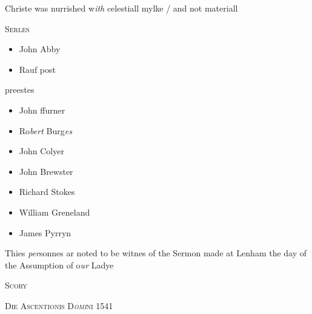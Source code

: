 \documentclass[12pt, a4paper]{book}
\begin{document}
		\ifthenelse{\isodd{\thepage}}
		{\reversemarginpar}
		{\normalmarginpar}
		Christe was nurrished w\textit{ith} celestiall mylke / and
            	not materiall
            
 

                  
				\begin{center}  {\scshape Serles}  \end{center}
			
 
 	
 	
 	
 		\begin{itemize}
 			\item[]John Abby
 			\item[]Rauf post
 		\end{itemize}
 		
 			
 			preestes
 		
 		\begin{itemize}
 			\item[]John ffurner
 			\item[]Ro\textit{bert} Burg\textit{es}
 			\item[]John Colyer
 			\item[]John Brewster
 			\item[]Richard Stokes
 			\item[]William Greneland
 			\item[]James Pyrryn
 		\end{itemize}
 			
		\ifthenelse{\isodd{\thepage}}
		{\reversemarginpar}
		{\normalmarginpar}
		 Thies \textit{per}sonnes ar noted to be witnes of the Sermon made at Lenham the day of the Assumption of o\textit{ur} Ladye
 

            
            
            
               
				\begin{center} \begin{large} {\scshape Scory
			} \end{large} \end{center}
			
               
                  
				\begin{center}  {\scshape 
                     Die Ascentionis D\textit{omi}ni 1541
                  }  \end{center}
			
\end{document}

